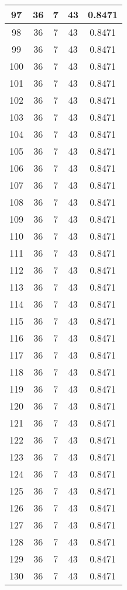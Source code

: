 \documentclass[letterpaper, 12pt]{article}
\begin{document}
\begin{longtable}{|c|c|c|c|c|}
\hline
97 & 36 & 7 & 43 & 0.8471 \\
\hline
98 & 36 & 7 & 43 & 0.8471 \\
\hline
99 & 36 & 7 & 43 & 0.8471 \\
\hline
100 & 36 & 7 & 43 & 0.8471 \\
\hline
101 & 36 & 7 & 43 & 0.8471 \\
\hline
102 & 36 & 7 & 43 & 0.8471 \\
\hline
103 & 36 & 7 & 43 & 0.8471 \\
\hline
104 & 36 & 7 & 43 & 0.8471 \\
\hline
105 & 36 & 7 & 43 & 0.8471 \\
\hline
106 & 36 & 7 & 43 & 0.8471 \\
\hline
107 & 36 & 7 & 43 & 0.8471 \\
\hline
108 & 36 & 7 & 43 & 0.8471 \\
\hline
109 & 36 & 7 & 43 & 0.8471 \\
\hline
110 & 36 & 7 & 43 & 0.8471 \\
\hline
111 & 36 & 7 & 43 & 0.8471 \\
\hline
112 & 36 & 7 & 43 & 0.8471 \\
\hline
113 & 36 & 7 & 43 & 0.8471 \\
\hline
114 & 36 & 7 & 43 & 0.8471 \\
\hline
115 & 36 & 7 & 43 & 0.8471 \\
\hline
116 & 36 & 7 & 43 & 0.8471 \\
\hline
117 & 36 & 7 & 43 & 0.8471 \\
\hline
118 & 36 & 7 & 43 & 0.8471 \\
\hline
119 & 36 & 7 & 43 & 0.8471 \\
\hline
120 & 36 & 7 & 43 & 0.8471 \\
\hline
121 & 36 & 7 & 43 & 0.8471 \\
\hline
122 & 36 & 7 & 43 & 0.8471 \\
\hline
123 & 36 & 7 & 43 & 0.8471 \\
\hline
124 & 36 & 7 & 43 & 0.8471 \\
\hline
125 & 36 & 7 & 43 & 0.8471 \\
\hline
126 & 36 & 7 & 43 & 0.8471 \\
\hline
127 & 36 & 7 & 43 & 0.8471 \\
\hline
128 & 36 & 7 & 43 & 0.8471 \\
\hline
129 & 36 & 7 & 43 & 0.8471 \\
\hline
130 & 36 & 7 & 43 & 0.8471 \\

\end{longtable}
\end{document}
